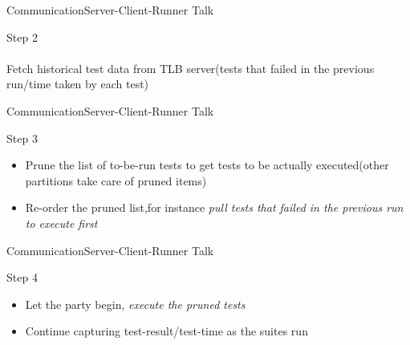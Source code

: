 \documentclass{beamer}
\begin{document}
\begin{frame}{Communication}{Server-Client-Runner Talk}
  \begin{multicols}{2}
    \begin{centering}
    \end{centering}
    \begin{center}
      {\huge Step 2}\\
      \quad\\
          {\large Fetch historical test data from TLB server(tests that failed in the previous run/time taken by each test)}
    \end{center}
  \end{multicols}
\end{frame}

\begin{frame}{Communication}{Server-Client-Runner Talk}
  \begin{multicols}{2}
    \begin{centering}
    \end{centering}
    \begin{center}
      {\huge Step 3}\\
      \begin{itemize}
          \item {\large Prune the list of to-be-run tests to get tests to be actually executed(other partitions take care of pruned items)}
          \item {\large Re-order the pruned list,for instance \emph{pull tests that failed in the previous run to execute first}}
      \end{itemize}
    \end{center}
  \end{multicols}
\end{frame}

\begin{frame}{Communication}{Server-Client-Runner Talk}
  \begin{multicols}{2}
    \begin{centering}
    \end{centering}
    \begin{center}
      {\huge Step 4}\\
          \begin{itemize}
          \item {\large Let the party begin, \emph{execute the pruned tests}}
          \item {\large Continue capturing test-result/test-time as the suites run}
          \end{itemize}
    \end{center}
  \end{multicols}
\end{frame}
\end{document}
